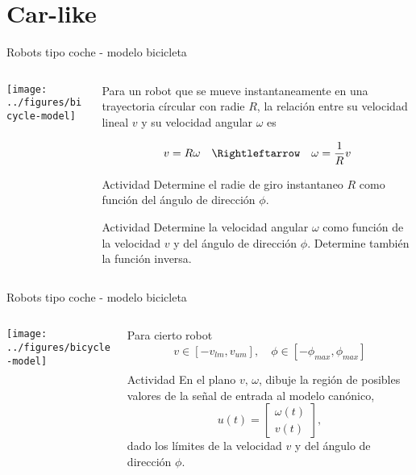 \documentclass[presentation,aspectratio=169]{beamer}
\begin{document}
\section{Car-like}
\label{sec:orgac9e6dc}

\begin{frame}[label={sec:org7a1a406}]{Robots tipo coche - modelo bicicleta}
\begin{columns}
\begin{column}{0.4\columnwidth}
\begin{center}
 \texttt{[image: ../figures/bicycle-model]}
\end{center}
\end{column}

\begin{column}{0.6\columnwidth}
\pause

Para un robot que se mueve instantaneamente en una trayectoria círcular con radie \(R\), la relación entre su velocidad lineal \(v\) y su velocidad angular \(\omega\) es

\pause

\[ v = R\omega \quad \Rightleftarrow \quad \omega = \frac{1}{R} v \]

\pause
\alert{Actividad} Determine el radie de giro instantaneo \(R\) como función del ángulo de dirección \(\phi\).

\pause
\alert{Actividad} Determine la velocidad angular \(\omega\) como función de la velocidad \(v\) y del ángulo de dirección \(\phi\). Determine también la función inversa.
\end{column}
\end{columns}
\end{frame}



\begin{frame}[label={sec:org5547307}]{Robots tipo coche - modelo bicicleta}
\begin{columns}
\begin{column}{0.4\columnwidth}
\begin{center}
 \texttt{[image: ../figures/bicycle-model]}
\end{center}
\end{column}

\begin{column}{0.6\columnwidth}
Para cierto robot
\[ v \in [-v_{lm}, v_{um}], \quad \phi \in [-\phi_{max}, \phi_{max}]\]


\pause

\alert{Actividad} En el plano \(v,\, \omega\), dibuje la región de posibles valores de la señal de entrada al modelo canónico,
\[ u(t) = \begin{bmatrix} \omega(t)\\v(t) \end{bmatrix}, \]
dado los límites de la velocidad \(v\) y del ángulo de dirección \(\phi\).
\end{column}
\end{columns}
\end{frame}
\end{document}
